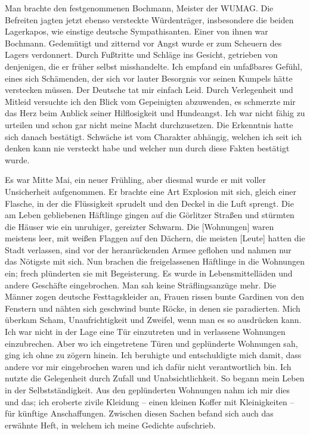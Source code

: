Man brachte den festgenommenen Bochmann, Meister der WUMAG. 
Die Befreiten jagten jetzt ebenso versteckte Würdenträger, insbesondere die beiden Lagerkapos, wie einstige deutsche Sympathisanten. Einer von ihnen war Bochmann. Gedemütigt und zitternd vor Angst wurde er zum Scheuern des Lagers verdonnert. Durch Fußtritte und Schläge ins Gesicht, getrieben von denjenigen, die er früher selbst misshandelte. Ich empfand ein unfaßbares Gefühl, eines sich Schämenden, der sich vor lauter Besorgnis vor seinen Kumpels hätte verstecken müssen. Der Deutsche tat mir einfach Leid. Durch Verlegenheit und Mitleid versuchte ich den Blick vom Gepeinigten abzuwenden, es schmerzte mir das Herz beim Anblick seiner Hilflosigkeit und Hundeangst. Ich war nicht fähig zu urteilen und schon gar nicht meine Macht durchzusetzen. Die Erkenntnis hatte sich danach bestätigt. Schwäche ist vom Charakter abhängig, welchen ich seit ich denken kann nie versteckt habe und welcher nun durch diese Fakten bestätigt wurde.

Es war Mitte Mai, ein neuer Frühling, aber diesmal wurde er mit voller Unsicherheit aufgenommen. Er brachte eine Art Explosion mit sich, gleich einer Flasche, in der die Flüssigkeit sprudelt und den Deckel in die Luft sprengt. Die am Leben gebliebenen Häftlinge gingen auf die Görlitzer Straßen und stürmten die Häuser wie ein unruhiger, gereizter Schwarm. Die [Wohnungen] waren meistens leer, mit weißen Flaggen auf den Dächern, die meisten [Leute] hatten die Stadt verlassen, sind vor der heranrückenden Armee geflohen und nahmen nur das Nötigste  mit sich. Nun brachen die freigelassenen Häftlinge in die Wohnungen ein; frech plünderten sie mit Begeisterung. Es wurde in Lebensmittelläden und andere Geschäfte eingebrochen. Man sah keine Sträflingsanzüge mehr. Die Männer zogen deutsche Festtagskleider an, Frauen rissen bunte Gardinen von den Fenstern und nähten sich geschwind bunte Röcke, in denen sie paradierten. Mich überkam Scham, Unaufrichtigkeit und Zweifel, wenn man es so ausdrücken kann. Ich war nicht in der Lage eine Tür einzutreten und in verlassene Wohnungen einzubrechen. Aber wo ich eingetretene Türen und geplünderte Wohnungen sah, ging ich ohne zu zögern hinein. Ich beruhigte und entschuldigte mich damit, dass andere vor mir eingebrochen waren und ich dafür nicht verantwortlich bin. Ich nutzte die Gelegenheit durch Zufall und Unabsichtlichkeit. So begann mein Leben in der Selbstständigkeit. Aus den geplünderten Wohnungen nahm ich mir dies und das; ich eroberte zivile Kleidung -- einen kleinen Koffer mit Kleinigkeiten -- für künftige Anschaffungen. Zwischen diesen Sachen befand sich auch das erwähnte Heft, in welchem ich meine Gedichte aufschrieb.

